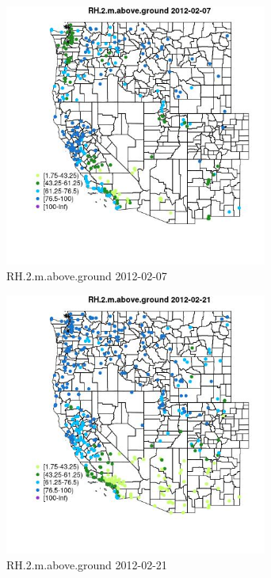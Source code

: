 \begin{figure} 
\centering  
\includegraphics[width=0.77\textwidth]{Code_Outputs/Report_ML_input_PM25_Step4_part_f_de_duplicated_aveswNAs_MapObsRH2maboveground2012-02-07.jpg} 
\caption{\label{fig:Report_ML_input_PM25_Step4_part_f_de_duplicated_aveswNAsMapObsRH2maboveground2012-02-07}RH.2.m.above.ground 2012-02-07} 
\end{figure} 
 

\begin{figure} 
\centering  
\includegraphics[width=0.77\textwidth]{Code_Outputs/Report_ML_input_PM25_Step4_part_f_de_duplicated_aveswNAs_MapObsRH2maboveground2012-02-21.jpg} 
\caption{\label{fig:Report_ML_input_PM25_Step4_part_f_de_duplicated_aveswNAsMapObsRH2maboveground2012-02-21}RH.2.m.above.ground 2012-02-21} 
\end{figure} 
 

